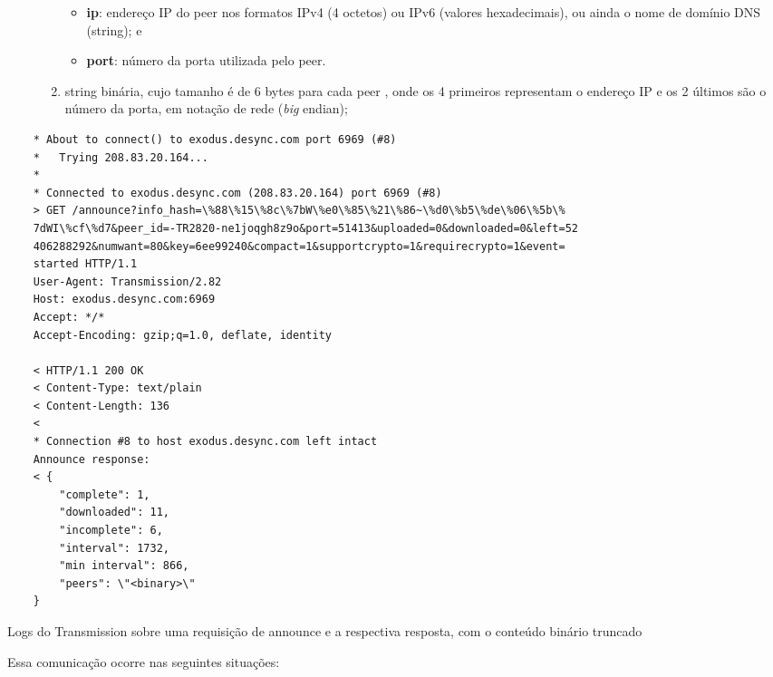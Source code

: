 \begin{description}
\begin{enumerate}
\begin{itemize}
                \item \textbf{ip}: endereço IP do \gls*{peer} nos formatos IPv4
                    (4 octetos) ou IPv6 (valores hexadecimais), ou ainda o nome de
                    domínio DNS (string); e

                \item \textbf{port}: número da porta utilizada pelo \gls*{peer}.
            \end{itemize}

            \item \gls*{string} binária, cujo tamanho é de 6 bytes para cada \gls*{peer}
                , onde os 4 primeiros representam o endereço IP e os 2 últimos são o
                número da porta, em notação de rede (\emph{big} \gls{endian});
        \end{enumerate}
\end{description}

\begin{listing}[H]
    \begin{verbatim}
    * About to connect() to exodus.desync.com port 6969 (#8)
    *   Trying 208.83.20.164...
    *
    * Connected to exodus.desync.com (208.83.20.164) port 6969 (#8)
    > GET /announce?info_hash=\%88\%15\%8c\%7bW\%e0\%85\%21\%86~\%d0\%b5\%de\%06\%5b\%
    7dWI\%cf\%d7&peer_id=-TR2820-ne1joqgh8z9o&port=51413&uploaded=0&downloaded=0&left=52
    406288292&numwant=80&key=6ee99240&compact=1&supportcrypto=1&requirecrypto=1&event=
    started HTTP/1.1
    User-Agent: Transmission/2.82
    Host: exodus.desync.com:6969
    Accept: */*
    Accept-Encoding: gzip;q=1.0, deflate, identity

    < HTTP/1.1 200 OK
    < Content-Type: text/plain
    < Content-Length: 136
    <
    * Connection #8 to host exodus.desync.com left intact
    Announce response:
    < {
        "complete": 1,
        "downloaded": 11,
        "incomplete": 6,
        "interval": 1732,
        "min interval": 866,
        "peers": \"<binary>\"
    }
    \end{verbatim}

    \caption{Logs do Transmission sobre uma requisição de announce e a respectiva
    resposta, com o conteúdo binário truncado}
    \label{lst:announce}
\end{listing}

Essa comunicação ocorre nas seguintes situações:

